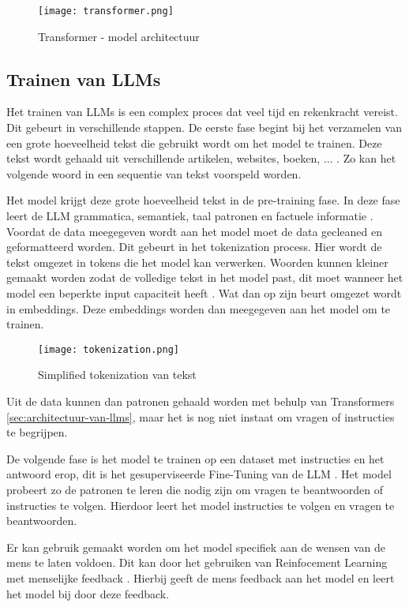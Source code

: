 \begin{figure}[h]
  \centering
  \texttt{[image: transformer.png]}
  \caption{Transformer - model architectuur \autocite{VaswaniEtAl2017}}
  \label{fig:transformer-model}
\end{figure}

\subsection{Trainen van LLMs}
\label{sec:trainen-van-llms}
Het trainen van LLMs is een complex proces dat veel tijd en rekenkracht vereist. Dit gebeurt in verschillende stappen.
De eerste fase begint bij het verzamelen van een grote hoeveelheid tekst die gebruikt wordt om het model te trainen.
Deze tekst wordt gehaald uit verschillende artikelen, websites, boeken, ... . Zo kan het volgende woord in een sequentie van tekst voorspeld worden.

Het model krijgt deze grote hoeveelheid tekst in de pre-training fase.
In deze fase leert de LLM grammatica, semantiek, taal patronen en factuele informatie \autocite{Cacic2023}.
Voordat de data meegegeven wordt aan het model moet de data gecleaned en geformatteerd worden.
Dit gebeurt in het tokenization process. Hier wordt de tekst omgezet in tokens die het model kan verwerken.
Woorden kunnen kleiner gemaakt worden zodat de volledige tekst in het model past, dit moet wanneer het model een beperkte input capaciteit heeft \autocite{ElHousieny2023}.
Wat dan op zijn beurt omgezet wordt in embeddings. Deze embeddings worden dan meegegeven aan het model om te trainen.
\begin{figure}[h]
  \centering
  \texttt{[image: tokenization.png]}
  \caption{Simplified tokenization van tekst \autocite{TeeTracker2023}}
  \label{fig:tokenization}
\end{figure}
Uit de data kunnen dan patronen gehaald worden met behulp van Transformers \ref{sec:architectuur-van-llms}, maar het is nog niet instaat om vragen of instructies te begrijpen.

De volgende fase is het model te trainen op een dataset met instructies en het antwoord erop, dit is het gesuperviseerde Fine-Tuning van de LLM \autocite{Das2024}. 
Het model probeert zo de patronen te leren die nodig zijn om vragen te beantwoorden of instructies te volgen.
Hierdoor leert het model instructies te volgen en vragen te beantwoorden.

Er kan gebruik gemaakt worden om het model specifiek aan de wensen van de mens te laten voldoen. Dit kan door het gebruiken van Reinfocement Learning met menselijke feedback \autocite{LambertEtAL2022}. 
Hierbij geeft de mens feedback aan het model en leert het model bij door deze feedback.

